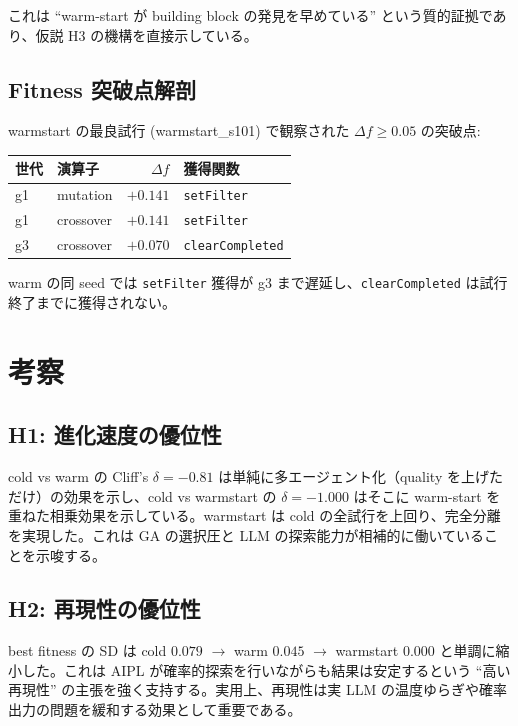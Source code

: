 \documentclass[a4paper,11pt]{ltjsarticle}
\begin{document}
これは ``warm-start が building block の発見を早めている'' という質的証拠であり、仮説 H3 の機構を直接示している。

\subsection{Fitness 突破点解剖}

warmstart の最良試行 (warmstart\_s101) で観察された $\Delta f \geq 0.05$ の突破点:

\begin{center}
\begin{tabular}{@{}llrl@{}}
\toprule
世代 & 演算子 & $\Delta f$ & 獲得関数 \\
\midrule
g1 & mutation  & $+0.141$ & \texttt{setFilter} \\
g1 & crossover & $+0.141$ & \texttt{setFilter} \\
g3 & crossover & $+0.070$ & \texttt{clearCompleted} \\
\bottomrule
\end{tabular}
\end{center}

warm の同 seed では \texttt{setFilter} 獲得が g3 まで遅延し、\texttt{clearCompleted} は試行終了までに獲得されない。

\section{考察}

\subsection{H1: 進化速度の優位性}

cold vs warm の Cliff's $\delta = -0.81$ は単純に多エージェント化（quality を上げただけ）の効果を示し、cold vs warmstart の $\delta = -1.000$ はそこに warm-start を重ねた相乗効果を示している。warmstart は cold の全試行を上回り、完全分離を実現した。これは GA の選択圧と LLM の探索能力が相補的に働いていることを示唆する。

\subsection{H2: 再現性の優位性}

best fitness の SD は cold $0.079$ $\to$ warm $0.045$ $\to$ warmstart $0.000$ と単調に縮小した。これは AIPL が確率的探索を行いながらも結果は安定するという ``高い再現性'' の主張を強く支持する。実用上、再現性は実 LLM の温度ゆらぎや確率出力の問題を緩和する効果として重要である。
\end{document}
